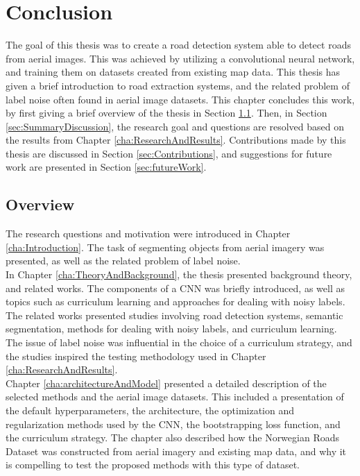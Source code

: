 \documentclass[a4paper]{book}
\begin{document}
\chapter{Conclusion}
\label{cha:evaluationAndConclusion}
The goal of this thesis was to create a road detection system able to detect roads from aerial images. This was achieved by utilizing a convolutional neural network, and training them on datasets created from existing map data. This thesis has given a brief introduction to road extraction systems, and the related problem of label noise often found in aerial image datasets. This chapter concludes this work, by first giving a brief overview of the thesis in Section \ref{sec:summaryOverview}. Then, in Section \ref{sec:SummaryDiscussion}, the research goal and questions are resolved based on the results from Chapter \ref{cha:ResearchAndResults}. Contributions made by this thesis are discussed in Section \ref{sec:Contributions}, and suggestions for future work are presented in Section \ref{sec:futureWork}.\\

\section{Overview}
\label{sec:summaryOverview}
The research questions and motivation were introduced in Chapter \ref{cha:Introduction}. The task of segmenting objects from aerial imagery was presented, as well as the related problem of label noise. \\

In Chapter \ref{cha:TheoryAndBackground}, the thesis presented background theory, and related works. The components of a \ac{CNN} was briefly introduced, as well as topics such as curriculum learning and approaches for dealing with noisy labels. The related works presented studies involving road detection systems, semantic segmentation, methods for dealing with noisy labels, and curriculum learning. The issue of label noise was influential in the choice of a curriculum strategy, and the studies inspired the testing methodology used in Chapter \ref{cha:ResearchAndResults}.\\

Chapter \ref{cha:architectureAndModel} presented a detailed description of the selected methods and the aerial image datasets. This included a presentation of the default hyperparameters, the architecture, the optimization and regularization methods used by the \ac{CNN}, the bootstrapping loss function, and the curriculum strategy. The chapter also described how the Norwegian Roads Dataset was constructed from aerial imagery and existing map data, and why it is compelling to test the proposed methods with this type of dataset.\\
\end{document}

